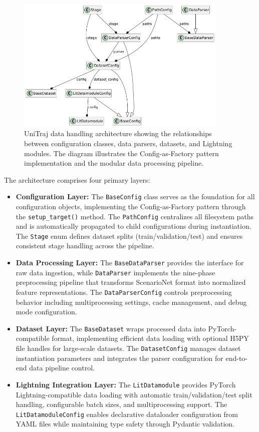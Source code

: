 \begin{figure}[htbp]
    \centering
    \includegraphics[width=0.9\textwidth]{figures/classes_DataHandling.png}
    \caption{UniTraj data handling architecture showing the relationships between configuration classes, data parsers, datasets, and Lightning modules. The diagram illustrates the Config-as-Factory pattern implementation and the modular data processing pipeline.}
    \label{fig:unitraj_data_architecture}
\end{figure}

The architecture comprises four primary layers:

\begin{itemize}[leftmargin=*]
    \item \textbf{Configuration Layer:} The \texttt{BaseConfig} class serves as the foundation for all configuration objects, implementing the Config-as-Factory pattern through the \texttt{setup\_target()} method. The \texttt{PathConfig} centralizes all filesystem paths and is automatically propagated to child configurations during instantiation. The \texttt{Stage} enum defines dataset splits (train/validation/test) and ensures consistent stage handling across the pipeline.
    \item \textbf{Data Processing Layer:} The \texttt{BaseDataParser} provides the interface for raw data ingestion, while \texttt{DataParser} implements the nine-phase preprocessing pipeline that transforms ScenarioNet format into normalized feature representations. The \texttt{DataParserConfig} controls preprocessing behavior including multiprocessing settings, cache management, and debug mode configuration.
    \item \textbf{Dataset Layer:} The \texttt{BaseDataset} wraps processed data into PyTorch-compatible format, implementing efficient data loading with optional H5PY file handles for large-scale datasets. The \texttt{DatasetConfig} manages dataset instantiation parameters and integrates the parser configuration for end-to-end data pipeline control.
    \item \textbf{Lightning Integration Layer:} The \texttt{LitDatamodule} provides PyTorch Lightning-compatible data loading with automatic train/validation/test split handling, configurable batch sizes, and multiprocessing support. The \texttt{LitDatamoduleConfig} enables declarative dataloader configuration from YAML files while maintaining type safety through Pydantic validation.
\end{itemize}

